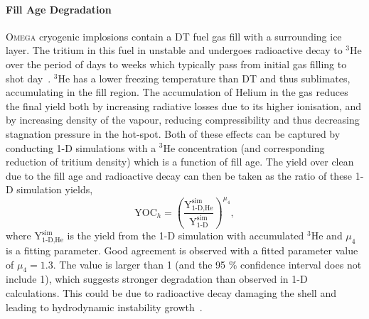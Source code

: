 \paragraph*{Fill Age Degradation}
\textsc{Omega} cryogenic implosions contain a DT fuel gas fill with a surrounding ice layer.
The tritium in this fuel in unstable and undergoes radioactive decay to ${}^{3}\text{He}$ over the period of days to weeks which typically pass from initial gas filling to shot day~\cite{regan_national_2019}.
${}^{3}\text{He}$ has a lower freezing temperature than DT and thus sublimates, accumulating in the fill region.
The accumulation of Helium in the gas reduces the final yield both by increasing radiative losses due to its higher ionisation, and by increasing density of the vapour, reducing compressibility and thus decreasing stagnation pressure in the hot-spot.
Both of these effects can be captured by conducting 1-D simulations with a ${}^{3}\text{He}$ concentration (and corresponding reduction of tritium density) which is a function of fill age.
The yield over clean due to the fill age and radioactive decay can then be taken as the ratio of these 1-D simulation yields,
\begin{equation}
    \text{YOC}_h = \left( \frac{\text{Y}^{\text{sim}}_{1\text{-D,He}}}{\text{Y}^{\text{sim}}_{1\text{-D}}} \right)^{\mu_4},
\end{equation}
where $\text{Y}^{\text{sim}}_{1\text{-D,He}}$ is the yield from the 1-D simulation with accumulated ${}^{3}\text{He}$ and $\mu_4$ is a fitting parameter.
Good agreement is observed with a fitted parameter value of $\mu_4 = 1.3$.
The value is larger than 1 (and the 95 \% confidence interval does not include 1), which suggests stronger degradation than observed in 1-D calculations.
This could be due to radioactive decay damaging the shell and leading to hydrodynamic instability growth~\cite{lees_understanding_2023}.

